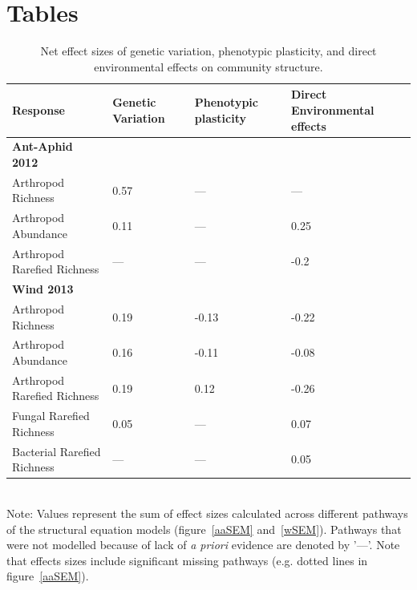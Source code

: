 \documentclass[11pt]{article}
\begin{document}




\newpage{}

\section*{Tables}
\renewcommand{\thetable}{\arabic{table}}
\setcounter{table}{0}


\begin{table}
\caption{Net effect sizes of genetic variation, phenotypic plasticity, and direct environmental effects on community structure.}
\label{tab:SEM}
\centering
\begin{tabular}{@{}llll@{}}
\toprule
Response & Genetic Variation & Phenotypic plasticity & Direct Environmental effects \\ 
\midrule
\textbf{Ant-Aphid 2012} & & & \\
Arthropod Richness  & 0.57 & --- & --- \\
Arthropod Abundance & 0.11 & --- & 0.25 \\
Arthropod Rarefied Richness & ---  & --- & -0.2 \\
\textbf{Wind 2013} & & & \\
 Arthropod Richness & 0.19 & -0.13 & -0.22 \\
Arthropod Abundance & 0.16 & -0.11 & -0.08 \\
Arthropod Rarefied Richness & 0.19 & 0.12 & -0.26 \\
Fungal Rarefied Richness & 0.05 & --- & 0.07 \\
Bacterial Rarefied Richness & --- & --- & 0.05 \\
\bottomrule
\end{tabular}
\bigskip{}
\\
{\footnotesize Note: Values represent the sum of effect sizes calculated across different pathways of the structural equation models (figure~\ref{aaSEM} and~\ref{wSEM}). Pathways that were not modelled because of lack of \textit{a priori} evidence are denoted by '---'. Note that effects sizes include significant missing pathways (e.g. dotted lines in figure~\ref{aaSEM}).}
\end{table}
\end{document}
